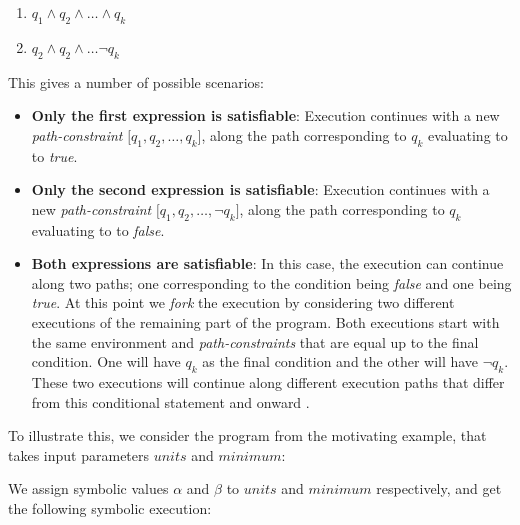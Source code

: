 		\begin{enumerate}
			\item $ q_1 \land q_2 \land \ldots \land q_k$
			\item $ q_2 \land q_2 \land \ldots \neg q_k$
		\end{enumerate}	
		This gives a number of possible scenarios:	
		\ifstm	
		\begin{itemize}
			\item \textbf{Only the first expression is satisfiable}: Execution continues with a new \emph{path-constraint} $\lbrack q_1, q_2, \ldots, q_k \rbrack$, along the path corresponding to $q_k$ evaluating to to \emph{true}.
			\item \textbf{Only the second expression is satisfiable}:  Execution continues with a new \emph{path-constraint} $\lbrack q_1, q_2, \ldots, \neg q_k \rbrack$, along the path corresponding to $q_k$ evaluating to to \emph{false}.
			
			\item \textbf{Both expressions are satisfiable}: In this case, the execution can continue along two paths; one corresponding to the condition being \emph{false} and one being \emph{true}. At this point we \emph{fork} the execution by considering two different executions of the remaining part of the program. Both executions start with the same environment and \emph{path-constraints} that are equal up to the final condition. One will have $q_k$ as the final condition and the other will have $\neg q_k$. 
			These two executions will continue along different execution paths that differ from this conditional statement and onward \citep{King76}.
		\end{itemize} 
		
		To illustrate this, we consider the program from the motivating example, that takes input parameters $units$ and $minimum$:
		
		\motexample{}
		\newpage
		We assign symbolic values $\alpha$ and $\beta$ to $units$ and $minimum$ respectively, and get the following symbolic execution:
		
